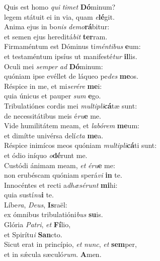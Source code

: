 \oddverse Quis est homo \textit{qui} \textit{ti}\textit{met} \textbf{Dó}minum?~\*\\
\oddverse legem státuit ei in via, quam \textit{e}\textbf{lé}git.\\
\evenverse Anima ejus in bo\textit{nis} \textit{de}\textit{mo}\textbf{rá}bitur:~\*\\
\evenverse et semen ejus hereditá\textit{bit} \textbf{ter}ram.\\
\oddverse Firmaméntum est Dóminus ti\textit{mén}\textit{ti}\textit{bus} \textbf{e}um:~\*\\
\oddverse et testaméntum ipsíus ut manifesté\textit{tur} \textbf{il}lis.\\
\evenverse Oculi mei \textit{sem}\textit{per} \textit{ad} \textbf{Dó}minum:~\*\\
\evenverse quóniam ipse evéllet de láqueo pe\textit{des} \textbf{me}os.\\
\oddverse Réspice in me, et mi\textit{se}\textit{ré}\textit{re} \textbf{me}i:~\*\\
\oddverse quia únicus et pauper \textit{sum} \textbf{e}go.\\
\evenverse Tribulatiónes cordis mei \textit{mul}\textit{ti}\textit{pli}\textbf{cá}tæ sunt:~\*\\
\evenverse de necessitátibus meis é\textit{ru}\textbf{e} me.\\
\oddverse Vide humilitátem meam, et \textit{la}\textit{bó}\textit{rem} \textbf{me}um:~\*\\
\oddverse et dimítte univérsa delí\textit{cta} \textbf{me}a.\\
\evenverse Réspice inimícos meos quóniam \textit{mul}\textit{ti}\textit{pli}\textbf{cá}ti sunt:~\*\\
\evenverse et ódio iníquo \textit{o}\textbf{dé}runt me.\\
\oddverse Custódi ánimam meam, \textit{et} \textit{é}\textit{ru}\textbf{e} me:~\*\\
\oddverse non erubéscam quóniam sperá\textit{vi} \textbf{in} te.\\
\evenverse Innocéntes et recti a\textit{dhæ}\textit{sé}\textit{runt} \textbf{mi}hi:~\*\\
\evenverse quia sustí\textit{nu}\textbf{i} te.\\
\oddverse Líbe\textit{ra}, \textit{De}\textit{us}, \textbf{Is}raël:~\*\\
\oddverse ex ómnibus tribulatióni\textit{bus} \textbf{su}is.\\
\evenverse Glória \textit{Pa}\textit{tri}, \textit{et} \textbf{Fí}lio,~\*\\
\evenverse et Spirítu\textit{i} \textbf{San}cto.\\
\oddverse Sicut erat in princípio, \textit{et} \textit{nunc}, \textit{et} \textbf{sem}per,~\*\\
\oddverse et in sǽcula sæculó\textit{rum}. \textbf{A}men.\\
